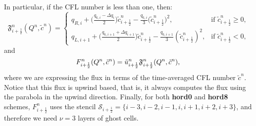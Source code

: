 In particular, if the CFL number is less than one, then:
\begin{equation}
	\label{chp-sec-flux:numerical-flux4}
        \mathfrak{F}_{i+\frac{1}{2}}^n(Q^n,\tilde{c}^n)  =  
    	\begin{cases}
        q_{R,i} +
        \big(\frac{{q_{6,i} - \Delta q_i}}{2}\big){\tilde{c}_{{i+\frac{1}{2}}}^n}
	- \frac{q_{6,i}}{3}{(\tilde{c}_{{i+\frac{1}{2}}}^n})^2, 
	& \text{if } \tilde{c}_{i+\frac{1}{2}}^n \geq 0,\\
	q_{L,i+1} +
	\big(\frac{q_{6,i+1} + \Delta q_{i+1}}{2}\big){\tilde{c}_{{i+\frac{1}{2}}}^n}
	-\frac{q_{6,i+1}}{3}({\tilde{c}_{{i+\frac{1}{2}}}^n})^2,
	& \text{if } \tilde{c}_{i+\frac{1}{2}}^n<0,
    	\end{cases}
\end{equation}
and
\begin{equation}
	\label{chp-sec-flux:numerical-flux5}
         {F}_{i+\frac{1}{2}}^n(Q^n,\tilde{c}^n) = 
         {\tilde{u}}_{i+\frac{1}{2}}^n\mathfrak{F}_{i+\frac{1}{2}}^n(Q^n,\tilde{c}^n),\\
\end{equation}
where we are expressing the flux in terms of the time-averaged CFL number $\tilde{c}^n$.
Notice that this flux is upwind based, that is, it always computes the flux using the parabola in the upwind direction.
Finally, for both \textbf{hord0} and \textbf{hord8} schemes, $F_{i+\frac{1}{2}}^n$ uses the stencil
$\mathcal{S}_{i+\frac{1}{2}} = \{i-3,i-2,i-1,i,i+1,i+2,i+3\}$, and therefore we need $\nu=3$ layers of ghost cells.

